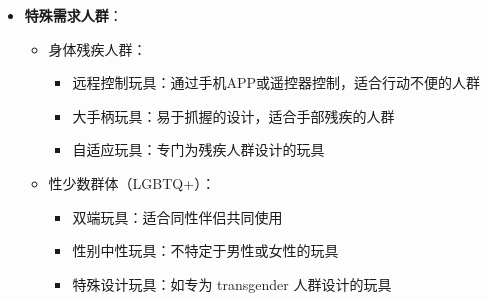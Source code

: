 \documentclass[12pt,UTF8]{ctexbook}
\begin{document}
\begin{itemize}
\begin{itemize}
\begin{itemize}
			\item 双端假阴茎：两端均可使用，适合互相刺激
			\item 情侣振动器：专为情侣设计的振动玩具
		\end{itemize}
		\item 增加互动性的玩具：
		\begin{itemize}
			\item 遥控振动器：由伴侣控制，增加惊喜和互动
			\item 情趣骰子：带有性爱指令的骰子，增加游戏乐趣
			\item 情趣卡牌：带有性爱挑战的卡牌，增加情趣
		\end{itemize}
		\item 探索SM的玩具：
		\begin{itemize}
			\item 束缚玩具：如手铐、脚镣、束缚带等，增加支配服从的快感
			\item 轻度击打玩具：如毛绒拍打器、情趣手拍等，提供轻度刺激
			\item 情趣眼罩和耳塞：剥夺视觉和听觉，增强其他感官的敏感度
		\end{itemize}
		\item 水中使用的玩具：
		\begin{itemize}
			\item 防水振动器：适合在浴缸或淋浴时使用
			\item 防水跳蛋：小巧便携，适合水中使用
			\item 硅基润滑剂：防水型润滑剂，适合水中使用
		\end{itemize}
	\end{itemize}
	\item \textbf{特殊需求人群}：
	\begin{itemize}
		\item 身体残疾人群：
		\begin{itemize}
			\item 远程控制玩具：通过手机APP或遥控器控制，适合行动不便的人群
			\item 大手柄玩具：易于抓握的设计，适合手部残疾的人群
			\item 自适应玩具：专门为残疾人群设计的玩具
		\end{itemize}
		\item 性少数群体（LGBTQ+）：
		\begin{itemize}
			\item 双端玩具：适合同性伴侣共同使用
			\item 性别中性玩具：不特定于男性或女性的玩具
			\item 特殊设计玩具：如专为 transgender 人群设计的玩具

\end{itemize}
\end{itemize}
\end{itemize}
\end{document}

